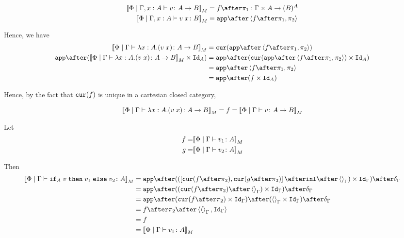 \documentclass{report}
\begin{document}
\begin{align}
    \deno{\etyperelation{\P}{\gax}{v}{\ab}} & = f \after \p : \G \times A \rightarrow (B)^A \\
    \deno{\etyperelation{\P}{\gax}{\apply{v}{x}}{B}} & = \app\after\pr{f \after \p}{\pp} \\
\end{align}

Hence, we have 
\begin{equation}
    \begin{split}
        \deno{\gpetyperelation{\lam{x}{A}{(\apply{v}{x})}}{\ab}} & = \cur{\app\after\pr{f \after \p}{\pp}}\\
        \app\after(\deno{\gpetyperelation{\lam{x}{A}{(\apply{v}{x})}}{\ab}} \times \Id{A}) & = \app \after(\cur{\app\after\pr{f \after \p}{\pp}}\times \Id{A})\\
        & = \app \after\pr{f\after\p}{\pp}\\
        & = \app\after(f\times\Id{A})
    \end{split}
\end{equation}

Hence, by the fact that $\texttt{cur}(f)$ is unique in a cartesian closed category, 

\begin{equation}
    {\bf [\![}\Phi\mid\Gamma \vdash \lambda x : A. (v\; x) \colon A\rightarrow B{\bf ]\!]}_M = f ={\bf [\![}\Phi\mid\Gamma \vdash v \colon A\rightarrow B{\bf ]\!]}_M
\end{equation}

Let
\begin{align}
    f = &{\bf [\![}\Phi\mid\Gamma \vdash v_1 \colon A{\bf ]\!]}_M\\
    g = &{\bf [\![}\Phi\mid\Gamma \vdash v_2 \colon A{\bf ]\!]}_M\\
\end{align}

Then
\begin{equation}
    \begin{split}
        \deno{\gpetyperelation{\pifthenelse{A}{v}{v_1}{v_2}}{A}} & = \ifMorph{\inl\after\term{\G}}{f}{g} \\
        & = \app\after((\cur{f\after\pp}\after\term{\G})\times\idg)\after\diag{\G}\\
        & = \app\after(\cur{f\after\pp}\times\idg)\after(\term{\G}\times\idg)\after\diag{\G}\\
        & = f\after\pp\after\pr{\term{\G}}{\idg}\\
        & = f \\
        & = \deno{\gpetyperelation{v_1}{A}}\\
    \end{split}
\end{equation}
\end{document}
